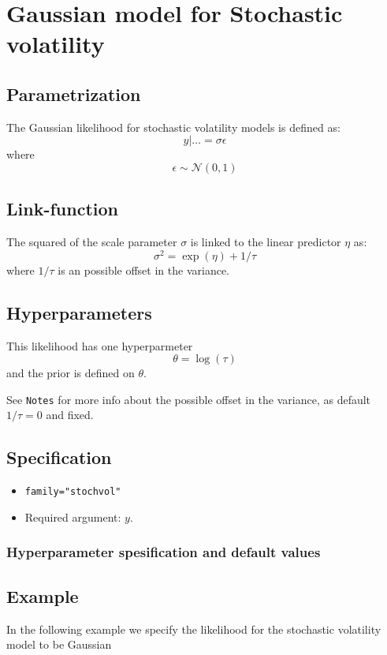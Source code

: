\documentclass[a4paper,11pt]{article}
\begin{document}
\section*{Gaussian model for Stochastic volatility}

\subsection*{Parametrization}

The Gaussian likelihood for stochastic volatility models is defined
as:
\[
y |\ldots =\sigma \epsilon
\]
where
\[
\epsilon \sim\mathcal{N}(0,1)
\]

\subsection*{Link-function}

The squared of the scale parameter $\sigma$ is linked to the linear predictor
$\eta$ as:
\[
\sigma^{2} =\exp(\eta) + 1/\tau
\]
where $1/\tau$ is an possible offset in the variance.

\subsection*{Hyperparameters}

This likelihood has one hyperparmeter
\begin{displaymath}
    \theta = \log(\tau)
\end{displaymath}
and the prior is defined on $\theta$.

See \texttt{Notes} for more info about the possible offset in the
variance, as default $1/\tau=0$ and fixed.

\subsection*{Specification}

\begin{itemize}
\item \texttt{family="stochvol"}
\item Required argument: $y$.
\end{itemize}

\subsubsection*{Hyperparameter spesification and default values}


\subsection*{Example}
In the following example we specify the likelihood for the stochastic
volatility model to be Gaussian
 
\end{document}
